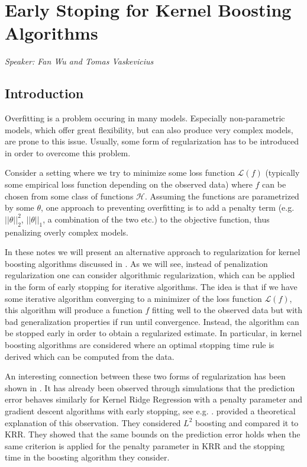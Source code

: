 
\chapter{Early Stoping for Kernel Boosting Algorithms}
\emph{Speaker: Fan Wu and Tomas Vaskevicius}\\


\section{Introduction}
Overfitting is a problem occuring in many models. Especially non-parametric models,
which offer great flexibility, but can also produce very complex models,
are prone to this issue. Usually, some form of regularization has to be introduced
in order to overcome this problem.

Consider a setting where we try to minimize some loss function $\mathcal{L}(f)$
(typically some empirical loss function depending on the observed data) where $f$
can be chosen from some class of functions $\mathcal{H}$. Assuming the
functions are parametrized by some $\theta$, one approach to preventing overfitting
is to add a penalty term (e.g. $||\theta||_2^2$, $||\theta||_1$, a combination of the two etc.)
to the objective function, thus penalizing overly complex models.

In these notes we will present an alternative approach to regularization for kernel boosting algorithms discussed in \cite{wain17ada}. As we will see, instead of penalization regularization one
can consider algorithmic regularization, which can be applied in the form of early stopping
for iterative algorithms. The idea is that if we have some iterative algorithm
converging to a minimizer of the loss function $\mathcal{L}(f)$, this algorithm will
produce a function $f$ fitting well to the observed data but with bad generalization properties
if run until convergence. Instead, the algorithm can be stopped early in order to obtain a regularized estimate.
In particular, in \cite{wain17ada} kernel boosting algorithms are considered
where an optimal stopping time rule is derived which can be computed from the data.

An interesting connection between these two forms of regularization has been shown in
\cite[Section 3.4]{raskutti2014early}.
It has already been observed through simulations that the prediction error behaves
similarly for Kernel Ridge Regression with a penalty parameter and gradient descent algorithms with early stopping, see e.g. \cite{friedman2004gradient}.
\citet{raskutti2014early} provided a theoretical explanation of this observation.
They considered $L^2$ boosting and compared it to KRR.
They showed that the same bounds on the prediction error holds when the same criterion
is applied for the penalty parameter in KRR and the stopping time in the boosting algorithm they consider.

